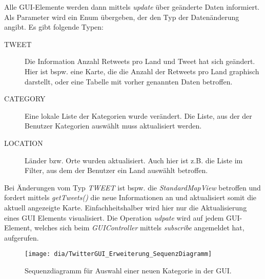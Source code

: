 Alle GUI-Elemente werden dann mittels \emph{update} über geänderte Daten informiert. Als Parameter wird ein Enum übergeben, der den Typ der Datenänderung angibt. Es gibt folgende Typen:
\begin{description}
	\item[TWEET] Die Information Anzahl Retweets pro Land und Tweet hat sich geändert. Hier ist bspw. eine Karte, die die Anzahl der Retweets pro Land graphisch darstellt, oder eine Tabelle mit vorher genannten Daten betroffen. 
	\item[CATEGORY] Eine lokale Liste der Kategorien wurde verändert. Die Liste, aus der der Benutzer Kategorien auswählt muss aktualisiert werden.
	\item[LOCATION] Länder bzw. Orte wurden aktualisiert. Auch hier ist z.B. die Liste im Filter, aus dem der Benutzer ein Land auswählt betroffen.
\end{description}
Bei Änderungen vom Typ \emph{TWEET} ist bspw. die \emph{StandardMapView} betroffen und fordert mittels \emph{getTweets()} die neue Informationen an und aktualisiert somit die aktuell angezeigte Karte. Einfachheitshalber wird hier nur die Aktualisierung eines GUI Elements visualisiert. Die Operation \emph{udpate} wird auf jedem GUI-Element, welches sich beim \emph{GUIController} mittels \emph{subscribe} angemeldet hat, aufgerufen.
\begin{figure}[h!]
	\centering
	\texttt{[image: dia/TwitterGUI\_Erweiterung\_SequenzDiagramm]}
	\caption{Sequenzdiagramm für Auswahl einer neuen Kategorie in der GUI.}
	\label{fig:GUISeq}
\end{figure}
